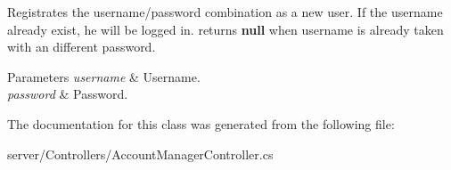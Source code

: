 Registrates the username/password combination as a new user. If the username already exist, he will be logged in. returns {\bfseries null} when username is already taken with an different password. 


\begin{DoxyParams}{Parameters}
{\em username} & Username.\\
\hline
{\em password} & Password.\\
\hline
\end{DoxyParams}


The documentation for this class was generated from the following file\-:\begin{DoxyCompactItemize}
\item 
server/\-Controllers/Account\-Manager\-Controller.\-cs\end{DoxyCompactItemize}
